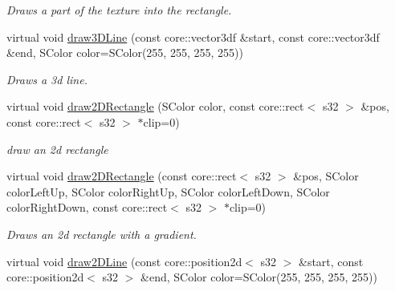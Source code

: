 \begin{DoxyCompactItemize}
\begin{DoxyCompactList}\small\item\em Draws a part of the texture into the rectangle. \end{DoxyCompactList}\item 
\hypertarget{classirr_1_1video_1_1_c_burning_video_driver_ad903cef1eb0adcb670db2a09c162ceb6}{virtual void \hyperlink{classirr_1_1video_1_1_c_burning_video_driver_ad903cef1eb0adcb670db2a09c162ceb6}{draw3\-D\-Line} (const core\-::vector3df \&start, const core\-::vector3df \&end, S\-Color color=S\-Color(255, 255, 255, 255))}\label{classirr_1_1video_1_1_c_burning_video_driver_ad903cef1eb0adcb670db2a09c162ceb6}

\begin{DoxyCompactList}\small\item\em Draws a 3d line. \end{DoxyCompactList}\item 
\hypertarget{classirr_1_1video_1_1_c_burning_video_driver_ae8a678794e1cc2a0e5ae9022657fb234}{virtual void \hyperlink{classirr_1_1video_1_1_c_burning_video_driver_ae8a678794e1cc2a0e5ae9022657fb234}{draw2\-D\-Rectangle} (S\-Color color, const core\-::rect$<$ s32 $>$ \&pos, const core\-::rect$<$ s32 $>$ $\ast$clip=0)}\label{classirr_1_1video_1_1_c_burning_video_driver_ae8a678794e1cc2a0e5ae9022657fb234}

\begin{DoxyCompactList}\small\item\em draw an 2d rectangle \end{DoxyCompactList}\item 
\hypertarget{classirr_1_1video_1_1_c_burning_video_driver_a9cc217475f79324c416874f55785c996}{virtual void \hyperlink{classirr_1_1video_1_1_c_burning_video_driver_a9cc217475f79324c416874f55785c996}{draw2\-D\-Rectangle} (const core\-::rect$<$ s32 $>$ \&pos, S\-Color color\-Left\-Up, S\-Color color\-Right\-Up, S\-Color color\-Left\-Down, S\-Color color\-Right\-Down, const core\-::rect$<$ s32 $>$ $\ast$clip=0)}\label{classirr_1_1video_1_1_c_burning_video_driver_a9cc217475f79324c416874f55785c996}

\begin{DoxyCompactList}\small\item\em Draws an 2d rectangle with a gradient. \end{DoxyCompactList}\item 
\hypertarget{classirr_1_1video_1_1_c_burning_video_driver_a1803703f03728aac4df8d8da53bf9327}{virtual void \hyperlink{classirr_1_1video_1_1_c_burning_video_driver_a1803703f03728aac4df8d8da53bf9327}{draw2\-D\-Line} (const core\-::position2d$<$ s32 $>$ \&start, const core\-::position2d$<$ s32 $>$ \&end, S\-Color color=S\-Color(255, 255, 255, 255))}\label{classirr_1_1video_1_1_c_burning_video_driver_a1803703f03728aac4df8d8da53bf9327}


\end{DoxyCompactItemize}
